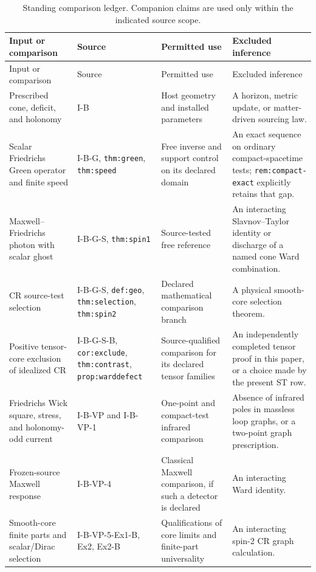 \documentclass[11pt,a4paper]{article}
\newcommand{\loc}[1]{\nolinkurl{#1}}
\theoremstyle{plain}
\theoremstyle{definition}
\theoremstyle{remark}
\numberwithin{equation}{section}
\begin{document}
\begingroup
\small
\renewcommand{\arraystretch}{1.12}
\begin{longtable}{@{}L{.20\linewidth}L{.22\linewidth}
                      L{.26\linewidth}L{.25\linewidth}@{}}
\caption{Standing comparison ledger. Companion claims are used
only within the indicated source scope.}
\label{tab:domain}\\
\toprule
Input or comparison & Source & Permitted use & Excluded inference\\
\midrule
\endfirsthead
\toprule
Input or comparison & Source & Permitted use & Excluded inference\\
\midrule
\endhead
\bottomrule
\endfoot

Prescribed cone, deficit, and holonomy &
I-B \cite{CheungIB} &
Host geometry and installed parameters &
A horizon, metric update, or matter-driven sourcing law.\\

Scalar Friedrichs Green operator and finite speed &
I-B-G, \loc{thm:green}, \loc{thm:speed}
\cite{CheungIBG} &
Free inverse and support control on its declared domain &
An exact sequence on ordinary compact-spacetime tests;
\loc{rem:compact-exact} explicitly retains that gap.\\

Maxwell--Friedrichs photon with scalar ghost &
I-B-G-S, \loc{thm:spin1}
\cite{CheungIBGS} &
Source-tested free reference &
An interacting Slavnov--Taylor identity or discharge of a
named cone Ward combination.\\

CR source-test selection &
I-B-G-S, \loc{def:geo}, \loc{thm:selection},
\loc{thm:spin2} \cite{CheungIBGS} &
Declared mathematical comparison branch &
A physical smooth-core selection theorem.\\

Positive tensor-core exclusion of idealized CR &
I-B-G-S-B, \loc{cor:exclude}, \loc{thm:contrast},
\loc{prop:warddefect} \cite{CheungTensor} &
Source-qualified comparison for its declared tensor families &
An independently completed tensor proof in this paper, or a
choice made by the present ST row.\\

Friedrichs Wick square, stress, and holonomy-odd current &
I-B-VP and I-B-VP-1 \cite{CheungVP,CheungVP1} &
One-point and compact-test infrared comparison &
Absence of infrared poles in massless loop graphs, or a
two-point graph prescription.\\

Frozen-source Maxwell response &
I-B-VP-4 \cite{CheungVP4} &
Classical Maxwell comparison, if such a detector is declared &
An interacting Ward identity.\\

Smooth-core finite parts and scalar/Dirac selection &
I-B-VP-5-Ex1-B, Ex2, Ex2-B
\cite{CheungEx1B,CheungEx2,CheungEx2B} &
Qualifications of core limits and finite-part universality &
An interacting spin-2 CR graph calculation.\\
\end{longtable}
\endgroup
\end{document}
